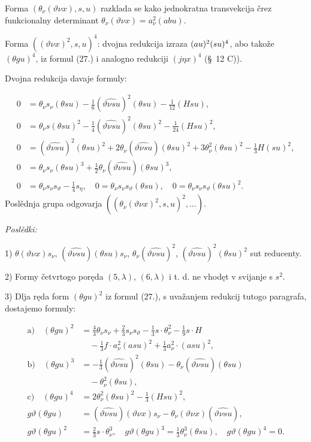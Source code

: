 \documentclass[11pt]{article}
\let\A\relax
\newcommand{\A}{\mathfrak A}
\begin{document}
Forma $(\theta_{\nu}(\vartheta\nu x),s,u)$ razklada se kako jednokratna transvekcija črez funkcionalny determinant $\theta_{\nu}(\vartheta\nu x)=a_{\nu}^2(abu)$.

Forma $((\vartheta\nu x)^2,s,u)^4$: dvojna redukcija izraza $(a\A u)^2(\A su)^4$, abo takože $(\theta gu)^4$, iz formul (27.) i analogno redukciji $(j\eta x)^4$ (\S\ 12 C)).

Dvojna redukcija davaje formuly:

\[
\tag{28}
\begin{aligned}
0&=\theta_{\nu}s_{\nu}(\theta su)-\frac16(\widehat{\vartheta\nu su})^2(\theta su)-\frac1{12}(Hsu),\\
0&=\theta_{\nu} s(\theta su)^2-\frac14(\widehat{\vartheta\nu su})^2(\theta su)^2-\frac1{24}(Hsu)^2,\\
0&=(\widehat{\vartheta\nu su})^2(\theta su)^2+2\theta_{\nu}(\widehat{\vartheta\nu su})(\theta su)^2
  +3\theta_{\nu}^2(\theta su)^2-\frac13H(su)^2,\\
0&=\theta_{\nu}s_{\nu}(\theta su)^3+\frac12\theta_{\nu}(\widehat{\vartheta\nu su})(\theta su)^3,\\
0&=\theta_{\nu}s_{\nu}s_\vartheta-\frac14s_\eta,
\quad 0=\theta_{\nu}s_{\nu}s_\vartheta(\theta su),
\quad 0=\theta_{\nu}s_{\nu}s_\vartheta(\theta su)^2.
\end{aligned}
\]
Poslědnja grupa odgovarja $((\theta_{\nu}(\vartheta\nu x)^2,s,u)^2,\ldots)$.

\noindent\textit{Poslědki:}

1) $\theta(\vartheta\nu x)s_{\nu}$, $(\widehat{\vartheta\nu su})(\theta su)s_{\nu}$, $\theta_{\nu}(\widehat{\vartheta\nu su})^2$, $(\widehat{\vartheta\nu su})^2(\theta su)^2$ sut reducenty.

2) Formy četvrtogo poręda $(5,\lambda)$, $(6,\lambda)$ i t. d. ne vhodęt v svijanje s $s^2$.

3) Dlja ręda form $(\theta gu)^2$ iz formul (27.), s uvažanjem redukcij tutogo paragrafa, dostajemo formuly:

\[
\tag{29}
\begin{aligned}
\mathrm{a)}\quad (\theta gu)^2&=\frac43\theta_{\nu}s_{\nu}+\frac23s_{\nu}s_\vartheta-\frac13s\cdot\theta_{\nu}^2-\frac19s\cdot H\\
&\quad-\frac13f\cdot a_{\nu}^2(asu)^2+\frac13a_{\nu}^2\cdot(asu)^2,\\
\mathrm{b)}\quad (\theta gu)^3&=-\frac13(\widehat{\vartheta\nu su})^2(\theta su)-\theta_{\nu}(\widehat{\vartheta\nu su})(\theta su)\\
&\quad-\theta_{\nu}^2(\theta su),\\
\mathrm{c)}\quad (\theta gu)^4&=2\theta_{\nu}^2(\theta su)^2-\frac13(Hsu)^2,\\
g\vartheta(\theta gu)&=(\widehat{\vartheta\nu su})(\vartheta\nu x)s_{\nu}-\theta_{\nu}(\vartheta\nu x)(\widehat{\vartheta\nu su}),\\
g\vartheta(\theta gu)^2&=\frac23s\cdot\theta_{\nu}^3,
\quad g\vartheta(\theta gu)^3=\frac13\theta_{\nu}^3(\theta su),
\quad g\vartheta(\theta gu)^4=0.
\end{aligned}
\]
\end{document}
